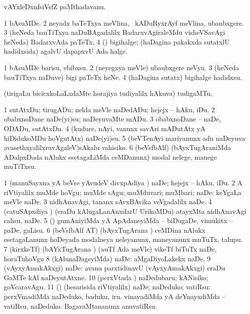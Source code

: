{\bentry
{} 
\gl{\nA}
\expl{}
\bmng
vAYxleDxnfsiVsfZ paMthadavanu. 
\emng
\eentry

\bentry
{} 
\gl{\nA}
\expl{}
\bmng
\bnum
\num{1} bAsuMDe. 
\num{2} neyadx baTeTxya meVlina, \udA\ kADuRyxrAyf meVlina, ubaubxgere. 
\num{3} (heNeda bauTiTxya naDuBAgadalilx BadarxvAgiraleMdu visheVSavAgi heNeda) BadarxvAda paTeTx. 
\num{4} (\nw) bigihalge; (haDagina pakakxda sutatxlU hadidxsida) agalvU dapapxvU Ada halge. 
\enum
\emng
\eentry

\bentry
{} 
\gl{\sakirx}
\expl{}
\bmng
\bnum
\num{1} bAsuMDe barisu, ebibxsu. 
\num{2} (neyegxya meVle) ubaubxgere neVyu. 
\num{3} (heNeda bauTiTxya naDuve) bigi paTeTx heNe. 
\num{4} (haDagina sutatx) bigihalge hadidxsu. 
\enum
\emng
\eentry

\bentry
{} 
\gl{\nA}
\expl{}
\bmng
(tirigaLu bicicxkoLaLxdaMte horajiya tudiyalilx hAkuva) tudigaMTu. 
\emng
\eentry

\bentry
{} 
\gl{\sakirx}
\expl{}
\bmng
\bnum
\num{1} sutAtxDu; tirugADu; nelda meVle naDedADu; hejejx -- hAku, iDu. 
\num{2} obabxnoDane naDe(yi)su; naDeyuvaMte mADu. 
\num{3} obabxnoDane -- naDe, ODADu, sutAtxDu. 
\num{4} (kudure, nAyi, \mo vanunx savAri mADutAtx yA hiDidukoMDu hoVgutAtx) naDe(yi)su. 
\num{5} (beVTenAyi mariyanunx adu naDeyuva avasethxyalilxruvAgaleV)sAkalu vahisiko. 
\num{6} (beVsfbAlf) (bAyxTugAraniMda ADalpxDada nAlukx esetagaLiMda ceMDanunx) modal nelege, manege muTiTxsu. 
\enum
\emng

\noindent
\gl{\akirx}
\expl{}
\bmng
\bnum
\num{1} (manuSayxna yA beVre yAvudeV divxpAdiya \vi) naDe; hejejx -- hAku, iDu. 
\num{2} A riVtiyalilx muMde hoVgu; muMde sAgu; muMduvari; muMbari; naDe:  keYgaLa meVle naDe. 
\num{3} nidhAnavAgi, tananx sAvxBAvika veVgadalilx naDe. 
\num{4} (catuSApxdiya \vi) (eraDu kAlugaLanAnxdarU UrikoMDu) atayxMta nidhAnavAgi calisu, naDe. 
\num{5} (\ame) gumAniyiMda yA ApAdaneyiMda -- biDugaDe, vimukitx -- paDe, gaLisu. 
\num{6} (beVsfbAlf AT) (bAyxTugArana \vi) ceMDina nAlukx esetagaLanunx hoDeyada modalneya neleyanunx, maneyanunx muTuTx, talupu. 
\num{7} (kirxkeTf) (bAYxTugArana \vi) (auTf Ada meVle) vikeTf biTuTx naDe, horaTuhoVgu 
\num{8} (kAlunaDageyiMda) naDe:  aMgaDiyoLakekx naDe. 
\num{9} (vAyxyAmakAkxgi) naDe:  avanu parxtidinavU (vAyxyAmakAkxgi) eraDu GaMTe kAl naDeyutAtxne. 
\num{10} (perxVtada \vi) naDedubaru; kANisiko; goVcaravAgu. 
\num{11} (\pArxparx) (hesarisida riVtiyalilx) naDe; naDeduko; vatiRsu:  perxVmadiMda naDeduko, baduku, iru.  vinayadiMda yA deYnayxdiMda -- vatiRsu, naDeduko.  BagavaMtananunx anuvatiRsu. 
\enum
\emng

}
